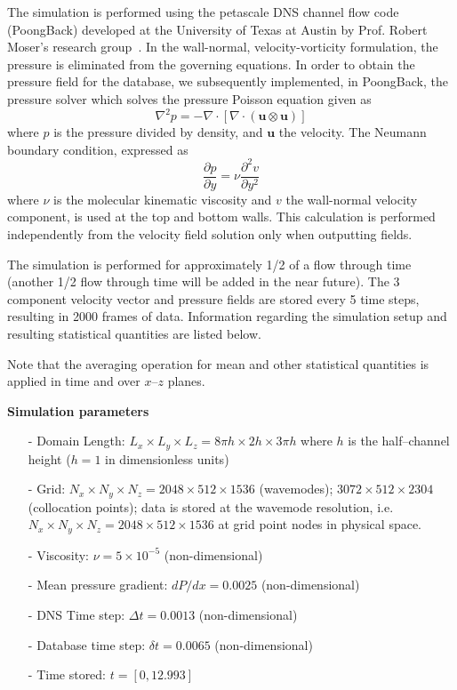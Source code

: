 \documentclass[11pt,letterpaper]{article}
\newcommand{\Div}[1] {\nabla \cdot #1}
\newcommand{\Lap}[1] {\nabla^2 #1}
\newcommand{\ppy}[1] {\frac{\partial #1}{\partial y}}
\newcommand{\ppyy}[1] {\frac{\partial^2 #1}{\partial y^2}}
\begin{document}
The simulation is performed using the petascale DNS channel flow code (PoongBack) developed at the University of Texas at Austin by Prof. Robert Moser's research group~\cite{Lee2013}. In the wall-normal, velocity-vorticity formulation, the pressure is eliminated from the governing equations. In order to obtain the pressure field for the database, we subsequently implemented, in PoongBack, the pressure solver which solves the pressure Poisson equation given as
\begin{equation}
  \Lap{p} = -\Div{\left[\Div{\left(\bm{u}\otimes\bm{u}\right)}\right]}
\end{equation}
where $p$ is the pressure divided by density, and $\bm{u}$ the velocity. The Neumann boundary condition, expressed as
\begin{equation}
  \ppy{p} = \nu \ppyy{v}
\end{equation}
where $\nu$ is the molecular kinematic viscosity and $v$ the wall-normal velocity component, is used at the top and bottom walls. This calculation is performed independently from the velocity field solution only when outputting fields.  

The simulation is performed for approximately 1/2 of a flow through time (another 1/2 flow through time will be added in the near future). The 3 component velocity vector and pressure fields are stored every 5 time steps, resulting in 2000 frames of data. Information regarding the simulation setup and resulting statistical quantities are listed below. 

Note that the averaging operation for mean and other statistical quantities is applied in time and over $x$--$z$ planes.

\newpage
\noindent \textbf{Simulation parameters}
\begin{itemize}
\itemsep0em
\item[-] Domain Length: $L_x \times L_y \times L_z = 8\pi h \times 2h \times 3\pi h$ where $h$ is the half--channel height ($h=1$ in dimensionless units)
\item[-] Grid: $N_x \times N_y \times N_z = 2048 \times 512 \times 1536$ (wavemodes); $3072 \times 512 \times 2304$ (collocation points); data is stored at the wavemode resolution, i.e. $N_x \times N_y \times N_z = 2048 \times 512 \times 1536$ at grid point nodes in physical space.
\item[-] Viscosity: $\nu = 5\times 10^{-5}$ (non-dimensional)
\item[-] Mean pressure gradient: $dP/dx = 0.0025$ (non-dimensional)
\item[-] DNS Time step: $\Delta t = 0.0013$ (non-dimensional)
\item[-] Database time step: $\delta t = 0.0065$ (non-dimensional)
\item[-] Time stored: $t=[0,12.993]$
\end{itemize}
\end{document}
